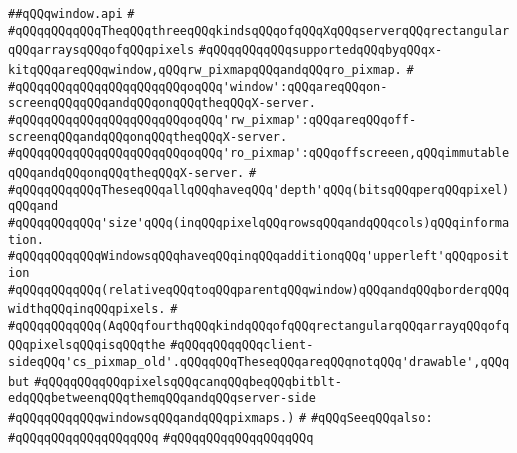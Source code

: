 \label{src/lib/x-kit/xclient/src/window/window.api}
\verb|##qQQqwindow.api|\newline
\verb|#|\newline
\verb|#qQQqqQQqqQQqTheqQQqthreeqQQqkindsqQQqofqQQqXqQQqserverqQQqrectangularqQQqarraysqQQqofqQQqpixels|\newline
\verb|#qQQqqQQqqQQqsupportedqQQqbyqQQqx-kitqQQqareqQQqwindow,qQQqrw_pixmapqQQqandqQQqro_pixmap.|\newline
\verb|#|\newline
\verb|#qQQqqQQqqQQqqQQqqQQqqQQqoqQQq'window':qQQqareqQQqon-screenqQQqqQQqandqQQqonqQQqtheqQQqX-server.|\newline
\verb|#qQQqqQQqqQQqqQQqqQQqqQQqoqQQq'rw_pixmap':qQQqareqQQqoff-screenqQQqandqQQqonqQQqtheqQQqX-server.|\newline
\verb|#qQQqqQQqqQQqqQQqqQQqqQQqoqQQq'ro_pixmap':qQQqoffscreeen,qQQqimmutableqQQqandqQQqonqQQqtheqQQqX-server.|\newline
\verb|#|\newline
\verb|#qQQqqQQqqQQqTheseqQQqallqQQqhaveqQQq'depth'qQQq(bitsqQQqperqQQqpixel)qQQqand|\newline
\verb|#qQQqqQQqqQQq'size'qQQq(inqQQqpixelqQQqrowsqQQqandqQQqcols)qQQqinformation.|\newline
\verb|#qQQqqQQqqQQqWindowsqQQqhaveqQQqinqQQqadditionqQQq'upperleft'qQQqposition|\newline
\verb|#qQQqqQQqqQQq(relativeqQQqtoqQQqparentqQQqwindow)qQQqandqQQqborderqQQqwidthqQQqinqQQqpixels.|\newline
\verb|#|\newline
\verb|#qQQqqQQqqQQq(AqQQqfourthqQQqkindqQQqofqQQqrectangularqQQqarrayqQQqofqQQqpixelsqQQqisqQQqthe|\newline
\verb|#qQQqqQQqqQQqclient-sideqQQq'cs_pixmap_old'.qQQqqQQqTheseqQQqareqQQqnotqQQq'drawable',qQQqbut|\newline
\verb|#qQQqqQQqqQQqpixelsqQQqcanqQQqbeqQQqbitblt-edqQQqbetweenqQQqthemqQQqandqQQqserver-side|\newline
\verb|#qQQqqQQqqQQqwindowsqQQqandqQQqpixmaps.)|\newline
\verb|#|\newline
\verb|#qQQqSeeqQQqalso:|\newline
\verb|#qQQqqQQqqQQqqQQqqQQq|\newline
\verb|#qQQqqQQqqQQqqQQqqQQq|\newline
